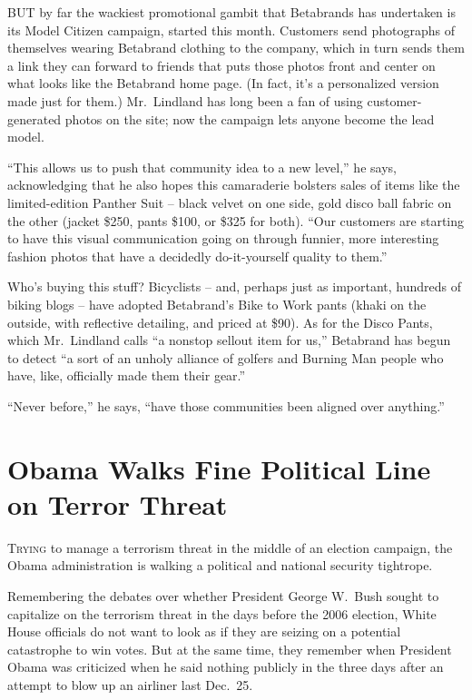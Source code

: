 ﻿\documentclass[12pt]{article}
\begin{document}
BUT by far the wackiest promotional gambit that Betabrands has undertaken is its Model Citizen
campaign, started this month. Customers send photographs of themselves wearing Betabrand clothing to
the company, which in turn sends them a link they can forward to friends that puts those photos
front and center on what looks like the Betabrand home page. (In fact, it's a personalized version
made just for them.) Mr.~Lindland has long been a fan of using customer-generated photos on the
site; now the campaign lets anyone become the lead model.

``This allows us to push that community idea to a new level,'' he says, acknowledging that he also
hopes this camaraderie bolsters sales of items like the limited-edition Panther Suit -- black velvet
on one side, gold disco ball fabric on the other (jacket \$250, pants \$100, or \$325 for both).
``Our customers are starting to have this visual communication going on through funnier, more
interesting fashion photos that have a decidedly do-it-yourself quality to them.''

Who's buying this stuff? Bicyclists -- and, perhaps just as important, hundreds of biking blogs --
have adopted Betabrand's Bike to Work pants (khaki on the outside, with reflective detailing, and
priced at \$90). As for the Disco Pants, which Mr.~Lindland calls ``a nonstop sellout item for us,''
Betabrand has begun to detect ``a sort of an unholy alliance of golfers and Burning Man people who
have, like, officially made them their gear.''

``Never before,'' he says, ``have those communities been aligned over anything.''

\section{Obama Walks Fine Political Line on Terror Threat}

\lettrine{T}{rying} to manage a terrorism threat in the middle of an
election campaign, the Obama administration is walking a political and national security tightrope.

Remembering the debates over whether President George W.~Bush sought to capitalize on the terrorism
threat in the days before the 2006 election, White House officials do not want to look as if they
are seizing on a potential catastrophe to win votes. But at the same time, they remember when
President Obama was criticized when he said nothing publicly in the three days after an attempt to
blow up an airliner last Dec.~25.
\end{document}
